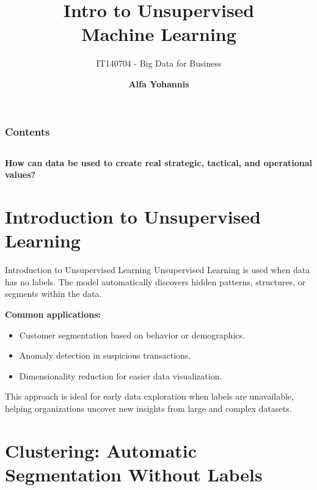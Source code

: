 \documentclass[aspectratio=169, table]{beamer}
\title{\Huge Intro to Unsupervised \\
\vspace{10pt}
Machine Learning}
\subtitle{IT140704 - Big Data for Business}
\author{\textbf{Alfa Yohannis}}
\begin{document}
\frame{\titlepage}


\begin{frame}[fragile]
\frametitle{Contents}
\vspace{20pt}
\begin{columns}[t]
	\tableofcontents[sections={1-5}]
	
	\tableofcontents[sections={6-20}]
\end{columns}
\end{frame}

\begin{frame}{\hfill}
	\centering
	\Huge{\textbf{How can data be used to create real strategic, tactical, and operational values?}}
\end{frame}


\section{Introduction to Unsupervised Learning}

\begin{frame}{Introduction to Unsupervised Learning}
	Unsupervised Learning is used when data has no labels. The model automatically discovers hidden patterns, structures, or segments within the data.
	
	\textbf{Common applications:}
	\begin{itemize}
		\item Customer segmentation based on behavior or demographics.
		\item Anomaly detection in suspicious transactions.
		\item Dimensionality reduction for easier data visualization.
	\end{itemize}
	
	This approach is ideal for early data exploration when labels are unavailable, helping organizations uncover new insights from large and complex datasets.
\end{frame}



\section{Clustering: Automatic Segmentation Without Labels}
\end{document}
